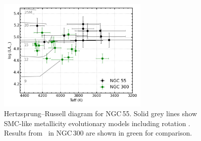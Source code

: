 \begin{figure}
 \centering
 \includegraphics[width=0.65\textwidth]{ngc55/NGC55-HRD}
 \caption[Hertzsprung--Russell diagram for NGC\,55]{Hertzsprung--Russell diagram for NGC\,55.
Solid grey lines show SMC-like metallicity evolutionary models including rotation
\protect\citep{2013A&A...558A.103G}.
Results from~\cite{2015ApJ...805..182G} in NGC\,300 are shown in green for comparison.}
 \label{fig:ngc55-HRD}
\end{figure}









